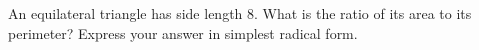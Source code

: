 An equilateral triangle has side length $8$. What is the ratio of its area to its perimeter? Express your answer in simplest radical form.
